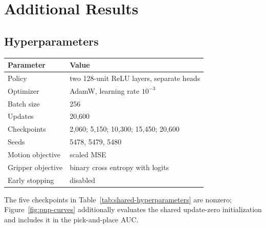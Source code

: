 \section{Additional Results}
\label{app:additional}

\begin{samepage}
\subsection{Hyperparameters}
\begin{center}
\begin{minipage}{\linewidth}
\centering
\makeatletter
\def\@captype{table}
\makeatother
\caption{Shared curriculum-training settings.}
\label{tab:shared-hyperparameters}
\small
\begin{tabular}{ll}
\toprule
Parameter & Value \\
\midrule
Policy & two 128-unit ReLU layers, separate heads \\
Optimizer & AdamW, learning rate $10^{-3}$ \\
Batch size & 256 \\
Updates & 20,600 \\
Checkpoints & 2,060; 5,150; 10,300; 15,450; 20,600 \\
Seeds & 5478, 5479, 5480 \\
Motion objective & scaled MSE \\
Gripper objective & binary cross entropy with logits \\
Early stopping & disabled \\
\bottomrule
\end{tabular}
\end{minipage}
\end{center}
\end{samepage}

The five checkpoints in Table~\ref{tab:shared-hyperparameters} are nonzero;
Figure~\ref{fig:pnp-curves} additionally evaluates the shared update-zero
initialization and includes it in the pick-and-place AUC.

